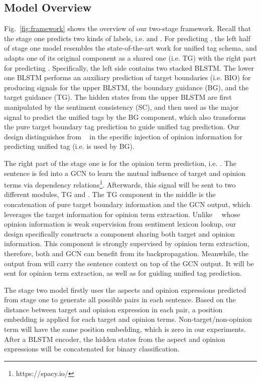 \documentclass[letterpaper]{article} \usepackage{aaai20}  \usepackage{times}  \usepackage{helvet} \usepackage{courier}  \usepackage[hyphens]{url}  \usepackage{graphicx} \urlstyle{rm} \def\UrlFont{\rm}  \usepackage{graphicx}  \frenchspacing  \setlength{\pdfpagewidth}{8.5in}  \setlength{\pdfpageheight}{11in}
\newcommand{\citet}[1]
{\citeauthor{#1}~\shortcite{#1}}
\begin{document}
\subsection{Model Overview}
Fig.~\ref{fig:framework} shows the overview of our two-stage framework. 
Recall that the stage one predicts two kinds of labels, i.e.  and . 
For predicting , the left half of stage one model resembles the state-of-the-art work \cite{li2019unified} for unified tag schema,
and adapts one of its original component as a shared one (i.e. TG) with the right part for predicting . 
Specifically, the left side contains two stacked BLSTM. The lower one BLSTM performs an auxiliary prediction of target boundaries (i.e. BIO) for producing signals for the upper BLSTM, the boundary guidance (BG), and the target guidance (TG). The hidden states from the upper BLSTM are first manipulated by the sentiment consistency (SC), and then used as the major signal to predict the unified tags by the BG component, which also transforms the pure target boundary tag prediction to guide unified tag prediction. Our design distinguishes from \citet{li2019unified} in the specific injection of opinion information for predicting unified tag (i.e.  is used by BG).



The right part of the stage one is for the opinion term prediction, i.e. . The sentence is fed into a GCN to learn the mutual influence of target and opinion terms via dependency relations\footnote{https://spacy.io/}.
Afterwards, this signal will be sent to two different modules, TG and . The TG component in the middle is the concatenation of pure target boundary information and the GCN output, which leverages the target information for opinion term extraction. Unlike~\citet{li2019unified} whose opinion information is weak supervision from sentiment lexicon lookup, our design specifically constructs a component sharing both target and opinion information. This component is strongly supervised by opinion term extraction, therefore, both  and GCN can benefit from its backpropagation. Meanwhile, the output from  will carry the sentence context on top of the GCN output. It will be sent for opinion term extraction, as well as for guiding unified tag prediction.



The stage two model firstly uses the aspects and opinion expressions predicted from stage one to generate all possible pairs in each sentence. Based on the distance between target and opinion expression in each pair, a position embedding is applied for each target and opinion terms. Non-target/non-opinion term will have the same position embedding, which is zero in our experiments. After a BLSTM encoder, the hidden states from the aspect and opinion expressions will be concatenated for binary classification.
\end{document}
